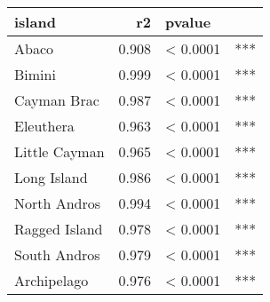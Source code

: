 
\begin{tabular}{l|r|l|l}
\hline
island & r2 & pvalue & \\
\hline
Abaco & 0.908 & < 0.0001 & ***\\
\hline
Bimini & 0.999 & < 0.0001 & ***\\
\hline
Cayman Brac & 0.987 & < 0.0001 & ***\\
\hline
Eleuthera & 0.963 & < 0.0001 & ***\\
\hline
Little Cayman & 0.965 & < 0.0001 & ***\\
\hline
Long Island & 0.986 & < 0.0001 & ***\\
\hline
North Andros & 0.994 & < 0.0001 & ***\\
\hline
Ragged Island & 0.978 & < 0.0001 & ***\\
\hline
South Andros & 0.979 & < 0.0001 & ***\\
\hline
Archipelago & 0.976 & < 0.0001 & ***\\
\hline
\end{tabular}
